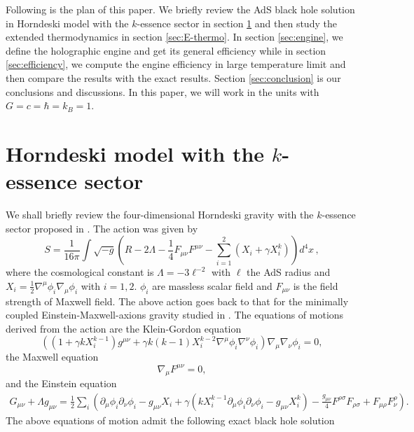 \documentclass[preprint,showpacs,showkeys,onecolumn,nofootinbib]{revtex4}
\begin{document}
Following is the plan of this paper. We briefly review the AdS black hole solution in Horndeski model with the $k$-essence sector in section \ref{sec:review} and then study the extended thermodynamics in section \ref{sec:E-thermo}. In section \ref{sec:engine}, we define the holographic engine and get its general efficiency while in section \ref{sec:efficiency}, we compute  the engine efficiency in large temperature limit and then compare the results with  the exact results. Section \ref{sec:conclusion} is our conclusions and discussions. In this paper, we will work in the units with $G=c=\hbar=k_B=1$.
\section{Horndeski model with the $k$-essence sector}\label{sec:review}
We shall briefly review the four-dimensional Horndeski gravity  with the $k$-essence sector proposed in \cite{Cisterna:2017jmv}. The action was given  by
\begin{equation}
S=\frac{1}{16\pi}
\int\sqrt{-g}\left(R-2\Lambda-\frac{1}{4}F_{\mu\nu}F^{\mu\nu}-\sum_{i=1}^{2}(X_i+\gamma X_i^k)\right)d^4x\,,
\label{action}
\end{equation}
where  the cosmological constant is  $\Lambda=-3\ell^{-2}$ with $\ell$ the AdS radius and $X_{i}=\frac12\nabla^{\mu}\phi_{i}\nabla_{\mu}\phi_{i}$ with $i=1,2$. $\phi_i$ are massless scalar field and $F_{\mu\nu}$ is the field strength of Maxwell field.  The above action
 goes back to that for  the minimally coupled Einstein-Maxwell-axions gravity  studied in \cite{Bardoux:2012aw,Andrade:2013gsa}.  The equations of motions derived from the action are
the Klein-Gordon equation
\begin{equation}
\left((1+\gamma kX_i^{k-1})g^{\mu\nu}+\gamma
k(k-1)X_i^{k-2}\nabla^{\mu}\phi_i\nabla^{\nu}\phi_i\right)\nabla_{\mu}\nabla_{\nu}\phi_i=0,
\label{KG}
\end{equation}
the Maxwell equation
\begin{equation}
\nabla_{\mu}F^{\mu\nu}=0,
\label{Maxwell}
\end{equation}
and the Einstein equation
\begin{eqnarray}
G_{\mu\nu}+\Lambda g_{\mu\nu}=\frac{1}{2}\sum_i\left(\partial_{\mu}\phi_i\partial_{\nu}\phi_i-g_{\mu\nu}X_i+\gamma(kX_i^{k-1}\partial_{\mu}\phi_i\partial_{\nu}\phi_i-g_{\mu\nu}X_i^k)
-\frac{g_{\mu\nu}}{4}F^{\rho\sigma}F_{\rho\sigma}+F_{\mu\rho}F_{\nu}^{\rho}\right).
\label{EOM}
\end{eqnarray}
The above equations of motion admit the following exact black hole solution
\end{document}
